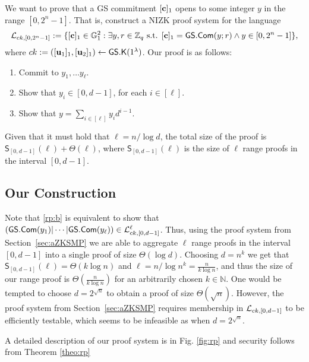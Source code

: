 We want to prove that a GS commitment $[\mathbf{c}]_1$ opens to some integer $y$ in the range $[0,2^n-1]$. That is, construct a NIZK proof system for the language
$$
\mathcal{L}_{ck,[0,2^n-1]} := \{[\mathbf{c}]_1\in\mathbb{G}_1^2: \exists y,r\in\mathbb{Z}_q\text{ s.t. }[\mathbf{c}]_1={\mathsf{GS}}.\mathsf{Com}(y;r)\wedge y\in[0,2^n-1]\},
$$
where $ck:=([\mathbf{u}_1]_1,[\mathbf{u}_2]_1)\gets{\mathsf{GS}}.\mathsf{K}(1^\lambda)$.
Our proof is as follows:
\begin{enumerate}[label=\alph*)]
\item Commit to $y_1,\ldots y_\ell$.
\item Show that $y_i\in[0,d-1]$, for each $i\in[\ell]$. \label{rp:b}
\item Show that $y=\sum_{i\in[\ell]}y_id^{i-1}$.
\end{enumerate}
Given that it must hold that $\ell=n/\log d$, the total size of the proof is $\mathsf{S}_{[0,d-1]}(\ell)+\Theta(\ell)$, where $\mathsf{S}_{[0,d-1]}(\ell)$ is the size of $\ell$ range proofs in the interval $[0,d-1]$.

\subsection{Our Construction}
Note that \ref{rp:b} is equivalent to show that $({\mathsf{GS}}.\mathsf{Com}(y_1)|\cdots|{\mathsf{GS}}.\mathsf{Com}(y_\ell))\in\mathcal{L}_{ck,[0,d-1]}^\ell$. Thus, using the proof system from Section~\ref{sec:aZKSMP} we are able to aggregate $\ell$ range proofs in the interval $[0,d-1]$ into a single proof of size $\Theta(\log d)$. Choosing $d=n^k$ we get that $\mathsf{S}_{[0,d-1]}(\ell)=\Theta(k\log n)$ and $\ell=n/\log n^k=\frac{n}{k\log n}$, and thus the size of our range proof is $\Theta(\frac{n}{k\log n})$ for an arbitrarily chosen $k\in\mathbb{N}$. One would be tempted to choose $d=2^{\sqrt{n}}$ to obtain a proof of size $\Theta(\sqrt{n})$. However, the proof system from Section~\ref{sec:aZKSMP} requires membership in $\mathcal{L}_{ck,[0,d-1]}$ to be efficiently testable, which seems to be infeasible as when $d=2^{\sqrt{n}}$.

A detailed description of our proof system is in Fig. \ref{fig:rp} and security follows from Theorem \ref{theo:rp}


